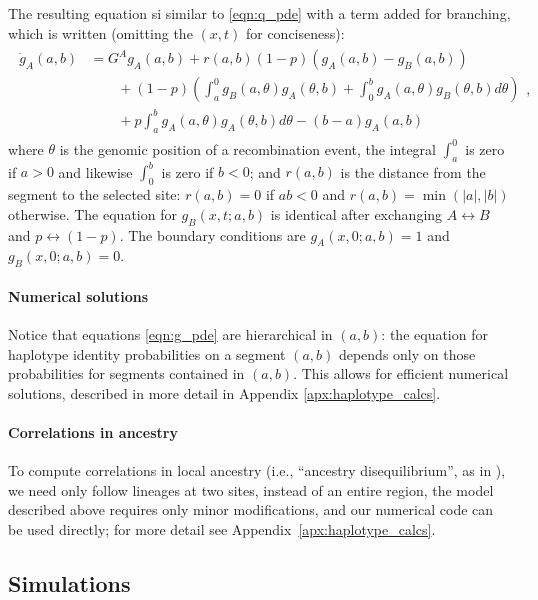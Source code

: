 \documentclass[11pt,letterpaper]{article}
\begin{document}
The resulting equation si similar to \eqref{eqn:q_pde} with a term added for branching,
which is written (omitting the $(x,t)$ for conciseness):
\begin{align}
    \begin{aligned} \label{eqn:g_pde}
        \dot g_A(a,b) 
        &= G^A g_A(a,b) + r(a,b) (1-p) (g_A(a,b)-g_B(a,b))
            \\ {} & \qquad 
            + (1-p) \left( \int_a^0 
                g_B(a,\theta) g_A(\theta,b)
                + \int_0^b g_A(a,\theta) g_B(\theta,b)
            d\theta \right)
            \\ {} & \qquad 
            + p \int_a^b {
                g_A(a,\theta) g_A(\theta,b) 
            } d\theta
            - (b-a) g_A(a,b)  
    \end{aligned} ,
\end{align}
where $\theta$ is the genomic position of a recombination event, 
the integral $\int_a^0$ is zero if $a>0$ and likewise $\int_0^b$ is zero if $b<0$;
and $r(a,b)$ is the distance from the segment to the selected site:
$r(a,b)=0$ if $ab<0$ and $r(a,b)=\min(|a|,|b|)$ otherwise.
The equation for $g_B(x,t;a,b)$ is identical after exchanging $A \leftrightarrow B$ and
$p \leftrightarrow (1-p)$.
The boundary conditions are $g_A(x,0;a,b)=1$ and $g_B(x,0;a,b)=0$.

\paragraph{Numerical solutions}
Notice that equations \eqref{eqn:g_pde}
are hierarchical in $(a,b)$:
the equation for haplotype identity probabilities on a segment $(a,b)$ depends only on those probabilities for segments contained in $(a,b)$.
This allows for efficient numerical solutions,
described in more detail in Appendix \ref{apx:haplotype_calcs}.


\paragraph{Correlations in ancestry}
To compute correlations in local ancestry
(i.e., ``ancestry disequilibrium'', as in \citet{Pool2015,Schumer2016}),
we need only follow lineages at two sites, instead of an entire region,
the model described above requires only minor modifications,
and our numerical code can be used directly;
for more detail see Appendix~\ref{apx:haplotype_calcs}.


\subsection*{Simulations}
\end{document}
